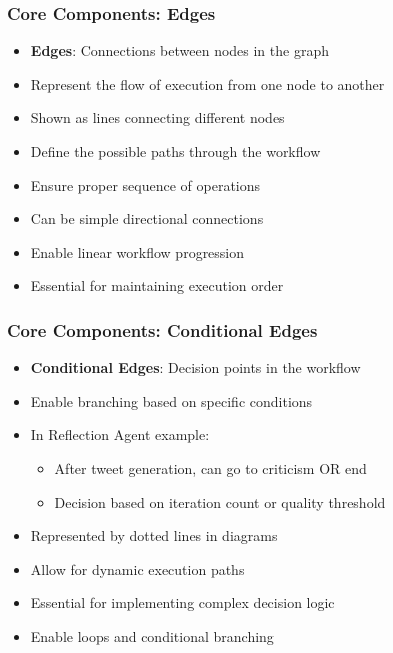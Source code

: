 \begin{frame}[fragile]\frametitle{Core Components: Edges}
      \begin{itemize}
        \item \textbf{Edges}: Connections between nodes in the graph
        \item Represent the flow of execution from one node to another
        \item Shown as lines connecting different nodes
        \item Define the possible paths through the workflow
        \item Ensure proper sequence of operations
        \item Can be simple directional connections
        \item Enable linear workflow progression
        \item Essential for maintaining execution order
      \end{itemize}
\end{frame}

\begin{frame}[fragile]\frametitle{Core Components: Conditional Edges}
      \begin{itemize}
        \item \textbf{Conditional Edges}: Decision points in the workflow
        \item Enable branching based on specific conditions
        \item In Reflection Agent example:
        \begin{itemize}
            \item After tweet generation, can go to criticism OR end
            \item Decision based on iteration count or quality threshold
        \end{itemize}
        \item Represented by dotted lines in diagrams
        \item Allow for dynamic execution paths
        \item Essential for implementing complex decision logic
        \item Enable loops and conditional branching
      \end{itemize}
\end{frame}

